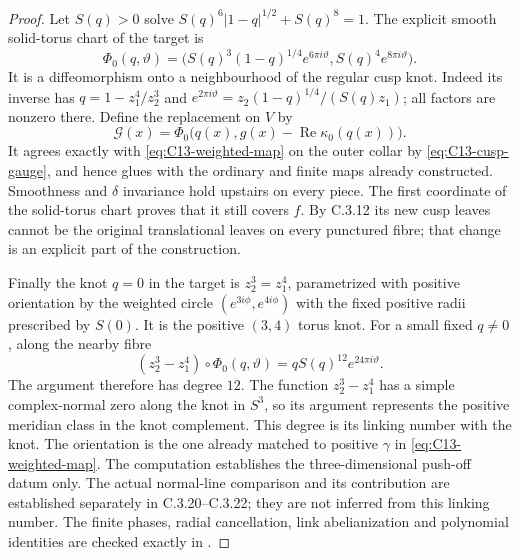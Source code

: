 \begin{proof}
Let $S(q)>0$ solve
$S(q)^6|1-q|^{1/2}+S(q)^8=1$. The explicit smooth solid-torus
chart of the target is
\[
 \Phi_0(q,\vartheta)=
 \bigl(S(q)^3(1-q)^{1/4}e^{6\pi i\vartheta},
                         S(q)^4e^{8\pi i\vartheta}\bigr).
\]
It is a diffeomorphism onto a neighbourhood of the regular
cusp knot. Indeed its inverse has
$q=1-z_1^4/z_2^3$ and
$e^{2\pi i\vartheta}=z_2(1-q)^{1/4}/(S(q)z_1)$;
all factors are nonzero there. Define the replacement on $V$
by
\[
 \mathcal G(x)=
 \Phi_0\bigl(q(x),g(x)-\operatorname{Re}\kappa_0(q(x))\bigr).
\]
It agrees exactly with \eqref{eq:C13-weighted-map} on the outer
collar by \eqref{eq:C13-cusp-gauge}, and hence glues with the
ordinary and finite maps already constructed. Smoothness and
$\delta$ invariance hold upstairs on every piece. The first
coordinate of the solid-torus chart proves that it still covers
$f$. By C.3.12 its new cusp leaves cannot be the original
translational leaves on every punctured fibre; that change is
an explicit part of the construction.

Finally the knot $q=0$ in the target is
$z_2^3=z_1^4$, parametrized with positive orientation by the
weighted circle $(e^{3i\phi},e^{4i\phi})$ with the fixed positive
radii prescribed by $S(0)$. It is the positive $(3,4)$ torus
knot. For a small fixed $q\ne0$, along the nearby fibre
\[
 (z_2^3-z_1^4)\circ\Phi_0(q,\vartheta)
                  =q S(q)^{12}e^{24\pi i\vartheta}.
\]
The argument therefore has degree $12$. The function
$z_2^3-z_1^4$ has a simple complex-normal zero along the
knot in $S^3$, so its argument represents the positive
meridian class in the knot complement. This degree is its
linking number with the knot. The orientation is the one
already matched to positive $\gamma$ in
\eqref{eq:C13-weighted-map}. The computation establishes the
three-dimensional push-off datum only. The actual normal-line
comparison and its contribution are established separately in
C.3.20--C.3.22; they are not inferred from this linking number.
The finite phases, radial cancellation, link abelianization and
polynomial identities are checked exactly in
.
\end{proof}
